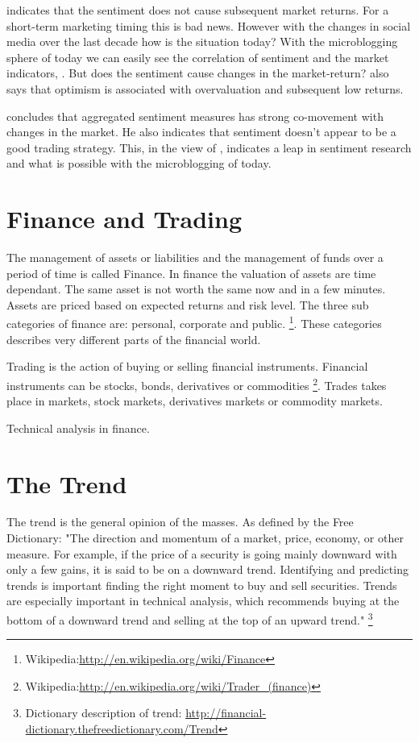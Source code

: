 \cite[p3]{Brown20041} indicates that the sentiment does not cause subsequent
market returns. For a short-term marketing timing this is bad news. However
with the changes in social media over the last decade how is the situation
today? With the microblogging sphere of today we can easily see the
correlation of sentiment and the market indicators,
\cite[]{annikajubbega11:twitter_driver_stock_price}. But
does the sentiment cause changes in the market-return?
\cite[p3]{Brown20041} also says that optimism is associated with overvaluation
and subsequent low returns.

\cite[p]{Brown20041} concludes that aggregated sentiment measures has strong
co-movement with changes in the market. He also indicates that sentiment
doesn't appear to be a good trading strategy. This, in the view of
\cite[]{Zhang201155}, indicates a leap in sentiment research and what is possible
with the microblogging of today.

\section{Finance and Trading}


The management of assets or liabilities and the management of funds over a
period of time is called Finance. In finance the valuation of assets are time
dependant. The same asset is not worth the same now and in a few minutes. Assets are
priced based on expected returns and risk level. The three sub categories of
finance are: personal, corporate and public. 
\footnote{Wikipedia:\url{http://en.wikipedia.org/wiki/Finance}}.
These categories describes very different parts of the financial world. 

Trading is the action of buying or selling financial instruments.
Financial instruments can be stocks, bonds, derivatives or commodities 
\footnote{Wikipedia:\url{http://en.wikipedia.org/wiki/Trader_(finance)}}.
Trades takes place in markets,  stock markets, derivatives markets or commodity
markets.

Technical analysis in finance. 


\section{The Trend}
The trend is the general opinion of the masses. As defined by the Free
Dictionary:  
"The direction and momentum of a market, price, economy, or other measure. For
example, if the price of a security is going mainly downward with only a few
gains, it is said to be on a downward trend. Identifying and
predicting trends is important finding the right moment to buy and sell
securities. Trends are especially important in technical analysis, which
recommends buying at the bottom of a downward trend and selling at the top of an
upward trend."
\footnote{Dictionary description of trend: \url{http://financial-dictionary.thefreedictionary.com/Trend}}


